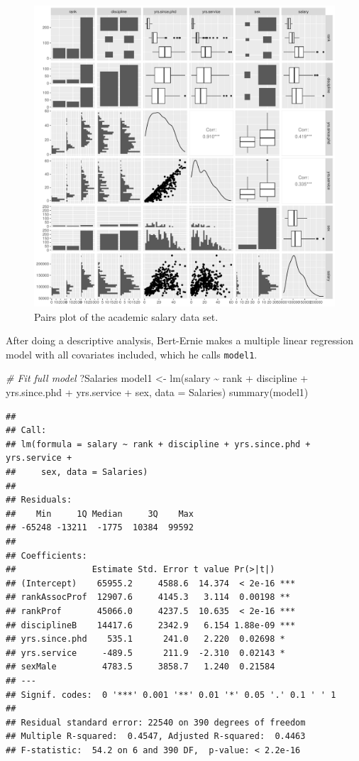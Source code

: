 \documentclass[
]{article}
\newenvironment{Shaded}{\begin{snugshade}}{\end{snugshade}}
\newcommand{\AttributeTok}[1]{\textcolor[rgb]{0.77,0.63,0.00}{#1}}
\newcommand{\CommentTok}[1]{\textcolor[rgb]{0.56,0.35,0.01}{\textit{#1}}}
\newcommand{\FunctionTok}[1]{\textcolor[rgb]{0.00,0.00,0.00}{#1}}
\newcommand{\NormalTok}[1]{#1}
\newcommand{\OtherTok}[1]{\textcolor[rgb]{0.56,0.35,0.01}{#1}}
\newcommand{\SpecialCharTok}[1]{\textcolor[rgb]{0.00,0.00,0.00}{#1}}
\begin{document}
\begin{figure}

{\centering \includegraphics[width=0.7\linewidth]{compulsory_files/figure-latex/desc-1} 

}

\caption{Pairs plot of the academic salary data set.}\label{fig:desc}
\end{figure}

After doing a descriptive analysis, Bert-Ernie makes a multiple linear
regression model with all covariates included, which he calls
\texttt{model1}.

\begin{Shaded}
\begin{Highlighting}[]
\CommentTok{\# Fit full model}
\NormalTok{?Salaries}
\NormalTok{model1 }\OtherTok{\textless{}{-}} \FunctionTok{lm}\NormalTok{(salary }\SpecialCharTok{\textasciitilde{}}\NormalTok{ rank }\SpecialCharTok{+}\NormalTok{ discipline }\SpecialCharTok{+}\NormalTok{ yrs.since.phd }\SpecialCharTok{+}\NormalTok{ yrs.service }\SpecialCharTok{+}\NormalTok{ sex, }\AttributeTok{data =}\NormalTok{ Salaries)}
\FunctionTok{summary}\NormalTok{(model1)}
\end{Highlighting}
\end{Shaded}

\begin{verbatim}
## 
## Call:
## lm(formula = salary ~ rank + discipline + yrs.since.phd + yrs.service + 
##     sex, data = Salaries)
## 
## Residuals:
##    Min     1Q Median     3Q    Max 
## -65248 -13211  -1775  10384  99592 
## 
## Coefficients:
##               Estimate Std. Error t value Pr(>|t|)    
## (Intercept)    65955.2     4588.6  14.374  < 2e-16 ***
## rankAssocProf  12907.6     4145.3   3.114  0.00198 ** 
## rankProf       45066.0     4237.5  10.635  < 2e-16 ***
## disciplineB    14417.6     2342.9   6.154 1.88e-09 ***
## yrs.since.phd    535.1      241.0   2.220  0.02698 *  
## yrs.service     -489.5      211.9  -2.310  0.02143 *  
## sexMale         4783.5     3858.7   1.240  0.21584    
## ---
## Signif. codes:  0 '***' 0.001 '**' 0.01 '*' 0.05 '.' 0.1 ' ' 1
## 
## Residual standard error: 22540 on 390 degrees of freedom
## Multiple R-squared:  0.4547, Adjusted R-squared:  0.4463 
## F-statistic:  54.2 on 6 and 390 DF,  p-value: < 2.2e-16
\end{verbatim}
\end{document}
